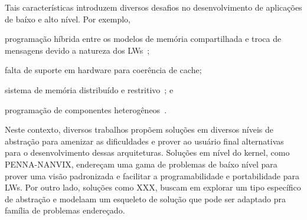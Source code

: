 	Tais características introduzem diversos desafios no desenvolvimento de
	aplicações de baíxo e alto nível. Por exemplo,
	\begin{enumerate*}[label=(\roman*)]
		\item programação híbrida entre os modelos de memória compartilhada
			e troca de mensagens devido a natureza dos LWs~\cite{kelly2013};

		\item falta de suporte em hardware para coerência de
			cache\cite{francesquini2015};

		\item sistema de memória distribuído e restritivo~\cite{Castro2016}; e

		\item programação de componentes heterogêneos~\cite{Barbalace2015}.
	\end{enumerate*}
	Neste contexto, diversos trabalhos propõem soluções em diversos níveis de
	abstração para amenizar as dificuldades e prover ao usuário final
	alternativas para o desenvolvimento dessas arquiteturas.
	Soluções em nível do kernel, como PENNA-NANVIX, endereçam uma gama de
	problemas de baíxo nível para prover uma visão padronizada e facilitar
	a programabilidade e portabilidade para LWs.
	Por outro lado, soluções como XXX, buscam em explorar um tipo específico de
	abstração e modelaam um esqueleto de solução que pode ser adaptado pra
	família de problemas endereçado.

